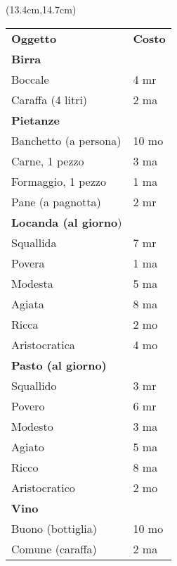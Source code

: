 \documentclass[a4paper,12 pt,openany]{book}
\begin{document}
\begin{textblock*}{6cm}(13.4cm,14.7cm) %

\begin{tabular}{ll}
\textbf{Oggetto}&\textbf{Costo}\\
\textbf{Birra}&\\
Boccale&4 mr\\
Caraffa (4 litri)&2 ma\\
\textbf{Pietanze} &\\
Banchetto (a persona)&10 mo\\
Carne, 1 pezzo&3 ma\\
Formaggio, 1 pezzo&1 ma\\
Pane (a pagnotta)&2 mr\\
\textbf{Locanda (al giorno})&\\
Squallida&7 mr\\
Povera&1 ma\\
Modesta&5 ma\\
Agiata&8 ma\\
Ricca&2 mo\\
Aristocratica&4 mo\\
\textbf{Pasto (al giorno)}&\\
Squallido&3 mr\\
Povero&6 mr\\
Modesto&3 ma\\
Agiato&5 ma\\
Ricco&8 ma\\
Aristocratico&2 mo\\
\textbf{Vino}&\\
Buono (bottiglia)&10 mo\\
Comune (caraffa)&2 ma\\
\end{tabular}

\end{textblock*}

~\newpage
\end{document}
